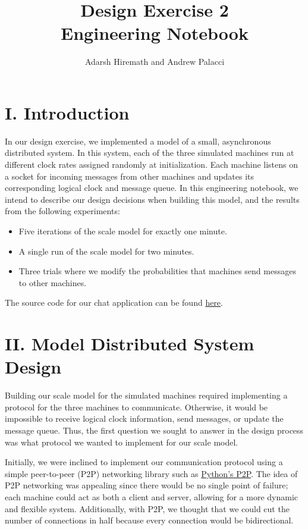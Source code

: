 \documentclass[
	a4paper, %
	10pt, %
	unnumberedsections, %
	twoside, %
]{LTJournalArticle}
\title{Design Exercise 2\\ Engineering Notebook} %
\author{%
	Adarsh Hiremath and Andrew Palacci
}
\begin{document}
\maketitle %


\section{I. Introduction}
In our design exercise, we implemented a model of a small, asynchronous distributed system. In this system, each of the three simulated machines run at different clock rates assigned randomly at initialization. Each machine listens on a socket for incoming messages from other machines and updates its corresponding logical clock and message queue. In this engineering notebook, we intend to describe our design decisions when building this model, and the results from the following experiments:
\begin{itemize}
    \item Five iterations of the scale model for exactly one minute. 
    \item A single run of the scale model for two minutes.
    \item Three trials where we modify the probabilities that machines send messages to other machines. 
\end{itemize}

The source code for our chat application can be found \href{https://github.com/andrewp2303/logical_clocks}{here}.

\section{II. Model Distributed System Design}

Building our scale model for the simulated machines required implementing a protocol for the three machines to communicate. Otherwise, it would be impossible to receive logical clock information, send messages, or update the message queue. Thus, the first question we sought to answer in the design process was what protocol we wanted to implement for our scale model. 

Initially, we were inclined to implement our communication protocol using a simple peer-to-peer (P2P) networking library such as \href{https://pypi.org/project/pyp2p/}{Python's P2P}. The idea of P2P networking was appealing since there would be no single point of failure;  each machine could act as both a client and server, allowing for a more dynamic and flexible system. Additionally, with P2P, we thought that we could cut the number of connections in half because every connection would be bidirectional. 
\end{document}
